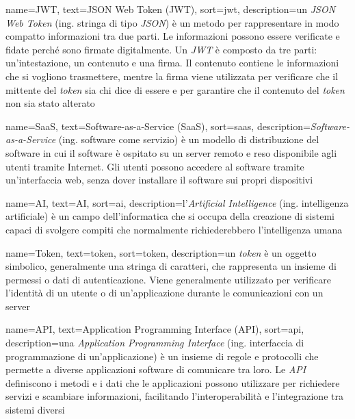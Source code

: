  {
    name=JWT,
    text=JSON Web Token (JWT),
    sort=jwt,
    description={un \emph{JSON Web Token} (ing. stringa di tipo \emph{JSON}) è un metodo per rappresentare in modo compatto informazioni tra due parti. Le informazioni possono essere verificate e fidate perché sono firmate digitalmente. Un \emph{JWT} è composto da tre parti: un'intestazione, un contenuto e una firma. Il contenuto contiene le informazioni che si vogliono trasmettere, mentre la firma viene utilizzata per verificare che il mittente del \emph{token} sia chi dice di essere e per garantire che il contenuto del \emph{token} non sia stato alterato}
}

 {
    name=SaaS,
    text=Software-as-a-Service (SaaS),
    sort=saas,
    description={\emph{Software-as-a-Service} (ing. software come servizio) è un modello di distribuzione del software in cui il software è ospitato su un server remoto e reso disponibile agli utenti tramite Internet. Gli utenti possono accedere al software tramite un'interfaccia web, senza dover installare il software sui propri dispositivi}
}

 {
    name=AI,
    text=AI,
    sort=ai,
    description={l'\emph{Artificial Intelligence} (ing. intelligenza artificiale) è un campo dell'informatica che si occupa della creazione di sistemi capaci di svolgere compiti che normalmente richiederebbero l'intelligenza umana}
}

 {
    name=Token,
    text=token,
    sort=token,
    description={un \emph{token} è un oggetto simbolico, generalmente una stringa di caratteri, che rappresenta un insieme di permessi o dati di autenticazione. Viene generalmente utilizzato per verificare l'identità di un utente o di un'applicazione durante le comunicazioni con un server}
}

 {
    name=API,
    text=Application Programming Interface (API),
    sort=api,
    description={una \emph{Application Programming Interface} (ing. interfaccia di programmazione di un'applicazione) è un insieme di regole e protocolli che permette a diverse applicazioni software di comunicare tra loro. Le \emph{API} definiscono i metodi e i dati che le applicazioni possono utilizzare per richiedere servizi e scambiare informazioni, facilitando l'interoperabilità e l'integrazione tra sistemi diversi}
}

